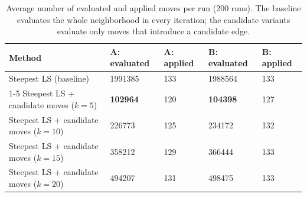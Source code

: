 \begin{table}[h!]
\centering
\footnotesize
\setlength{\tabcolsep}{3pt}
\renewcommand{\arraystretch}{1.5}
\caption{Average number of evaluated and applied moves per run (200 runs). The baseline evaluates the whole neighborhood in every iteration; the candidate variants evaluate only moves that introduce a candidate edge.}
\label{tab:task4_moves}
\vspace{0.5em}
\begin{tabularx}{\textwidth}{p{7.2cm} X X X X}
\toprule
\textbf{Method} & \textbf{A: evaluated} & \textbf{A: applied} & \textbf{B: evaluated} & \textbf{B: applied} \\
\midrule
Steepest LS (baseline) & 1991385 & 133 & 1988564 & 133 \\
\cmidrule{1-5}
Steepest LS + candidate moves ($k = 5$) & \textbf{102964} & 120 & \textbf{104398} & 127 \\
Steepest LS + candidate moves ($k = 10$) & 226773 & 125 & 234172 & 132 \\
Steepest LS + candidate moves ($k = 15$) & 358212 & 129 & 366444 & 133 \\
Steepest LS + candidate moves ($k = 20$) & 494207 & 131 & 498475 & 133 \\
\bottomrule
\end{tabularx}
\end{table}

